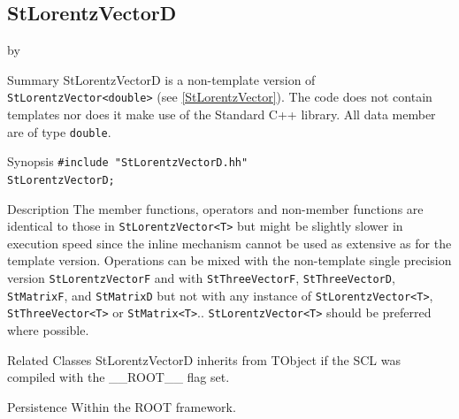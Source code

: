 \documentclass[twoside]{article}
\newcommand{\name}[1]{\textsf{#1}}%
\newcommand{\entrylabel}[1]{\mbox{\textbf{{#1}}}\hfil}%
\newenvironment{entry}
{\begin{list}{}%
    {\renewcommand{\makelabel}{\entrylabel}%
     \setlength{\labelwidth}{90pt}%
     \setlength{\leftmargin}{\labelwidth}
     \advance\leftmargin by \labelsep%
      }%
    }%
  {\end{list}}
\newcommand{\Entrylabel}[1]%
{\raisebox{0pt}[1ex][0pt]{\makebox[\labelwidth][l]%
    {\parbox[t]{\labelwidth}{\hspace{0pt}\textbf{{#1}}}}}}
\newenvironment{Entry}%
{\renewcommand{\entrylabel}{\Entrylabel}\begin{entry}}%
  {\end{entry}}
\begin{document}
\subsection{StLorentzVectorD } \label{StLorentzVectorD}
\begin{Entry}
\item[Summary]
    StLorentzVectorD is a non-template version of \verb+StLorentzVector<double>+
    (see \ref{StLorentzVector}). The code does not contain templates nor
    does it make use of the Standard C++ library. All data member are of
    type \texttt{double}.
    
\item[Synopsis]
    \verb+#include "StLorentzVectorD.hh"+ \\
    \verb+StLorentzVectorD;+
    
    
\item[Description]       
    The member functions, operators and non-member functions are identical
    to those in \verb+StLorentzVector<T>+ but might be slightly slower in execution speed
    since the inline mechanism cannot be used as extensive as for the template
    version. Operations can be mixed with the non-template single precision version
    \texttt{StLorentzVectorF} and with \texttt{StThreeVectorF}, \texttt{StThreeVectorD},
    \texttt{StMatrixF}, and \texttt{StMatrixD}
    but not with any instance of \verb+StLorentzVector<T>+, \verb+StThreeVector<T>+ or
    \verb+StMatrix<T>+..
    \verb+StLorentzVector<T>+ should be preferred where possible.

\item[Related Classes]
    StLorentzVectorD inherits from TObject 
    if the SCL was compiled with the \name{\_\_ROOT\_\_} flag set.
    
\item[Persistence]
    Within the ROOT framework.

\end{Entry}

%
%
\end{document}
